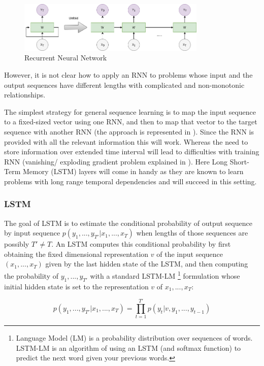 \begin{figure}[h]
	\centering
	\includegraphics[width=0.8\textwidth]{img/RNN.png}
	\caption{\label{fig:RNN}Recurrent Neural Network}
\end{figure}
 
However, it is not clear how to apply an RNN to problems whose input and the output sequences have different lengths with complicated and non-monotonic relationships.

The simplest strategy for general sequence learning is to map the input sequence to a fixed-sized
vector using one RNN, and then to map that vector to the target sequence with another RNN (the
approach is represented in \cite{baseline_NMT}). Since the RNN is provided with all the relevant information this will work. Whereas the need to store information over extended time interval will lead to difficulties with training RNN (vanishing/ exploding gradient problem explained in \cite{LSTM_baseline}).
Here Long Short-Term Memory (LSTM) layers will come in handy as they are known to learn problems with long range temporal dependencies and will succeed in this setting.

\subsubsection{LSTM}

The goal of LSTM is to estimate the conditional probability of output sequence by input sequence $p(y_1, ..., y_{T′}|x_1, ..., x_T )$ when lengths of those sequences are possibly $T' \neq T$. 
An LSTM computes this conditional probability by first obtaining the fixed dimensional
representation $v$ of the input sequence $(x_1, ..., x_T)$ given by the last hidden state of the LSTM, and then computing the probability of $y_1, ..., y_{T′}$ with a standard LSTM-LM
\footnote{Language Model (LM) is a probability distribution over sequences of words. LSTM-LM is an algorithm of using an LSTM (and softmax function) to predict the next word given your previous words.} 
formulation whose initial hidden state is set to the representation $v$ of  $x_1, ..., x_T$:

$$p(y_1, ..., y_{T′}|x_1, ..., x_T ) = \prod_{t=1}^{T'} p(y_t|v, y_1, ..., y_{t-1}) $$


